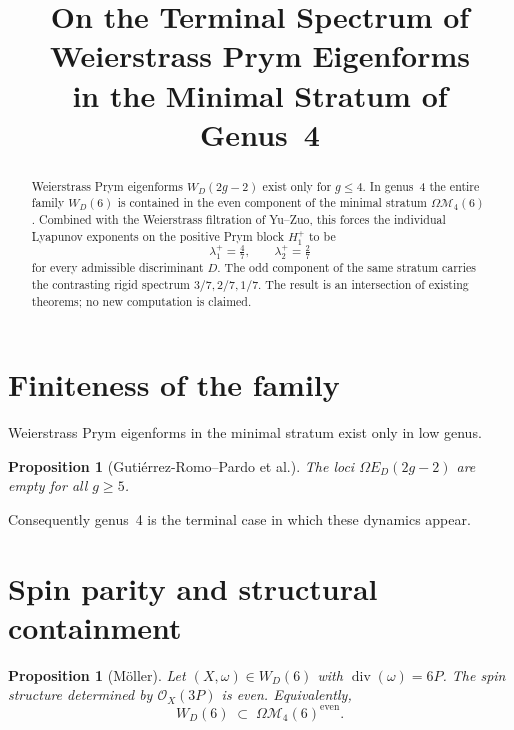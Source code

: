 \documentclass[11pt,a4paper]{article}
\title{On the Terminal Spectrum of Weierstrass Prym Eigenforms\\
in the Minimal Stratum of Genus~4}
\author{}
\date{}
\newtheorem{proposition}[theorem]{Proposition}
\begin{document}
\maketitle

\begin{abstract}
Weierstrass Prym eigenforms \(W_D(2g-2)\) exist only for \(g\le 4\).
In genus~4 the entire family \(W_D(6)\) is contained in the even component
of the minimal stratum \(\Omega\mathcal{M}_4(6)\). Combined with the
Weierstrass filtration of Yu--Zuo, this forces the individual Lyapunov
exponents on the positive Prym block \(H_1^+\) to be
\[
\lambda_1^+=\tfrac47,\qquad\lambda_2^+=\tfrac27
\]
for every admissible discriminant \(D\). The odd component of the same
stratum carries the contrasting rigid spectrum \(3/7,2/7,1/7\). The result
is an intersection of existing theorems; no new computation is claimed.
\end{abstract}

\section{Finiteness of the family}
Weierstrass Prym eigenforms in the minimal stratum exist only in low genus.
\begin{proposition}[Guti\'errez-Romo--Pardo et al.]
The loci \(\Omega E_D(2g-2)\) are empty for all \(g\ge 5\).
\end{proposition}
Consequently genus~4 is the terminal case in which these dynamics appear.

\section{Spin parity and structural containment}
\begin{proposition}[M\"oller]
Let \((X,\omega)\in W_D(6)\) with \(\operatorname{div}(\omega)=6P\).
The spin structure determined by \(\mathcal{O}_X(3P)\) is even.
Equivalently,
\[
W_D(6)\;\subset\;\Omega\mathcal{M}_4(6)^{\mathrm{even}}.
\]
\end{proposition}
\end{document}
